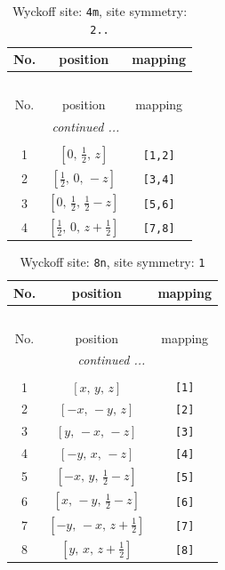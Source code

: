 \documentclass[fleqn,8pt]{jsarticle}
\begin{document}
\renewcommand{\arraystretch}{1.2}
\begin{longtable}{ccc}
\caption{Wyckoff site: {\tt 4m}, site symmetry: {\tt 2..}}
 \\
 \hline \hline
No. & position & mapping \\ \hline \endfirsthead

\multicolumn{2}{l}{\tablename\ \thetable{}} \\
 \hline \hline
No. & position & mapping \\ \hline \endhead

 \hline \hline
\multicolumn{2}{r}{\footnotesize\it continued ...} \\ \endfoot

 \hline \hline
\multicolumn{2}{r}{} \\ \endlastfoot

1 & $\left[ 0,\, \frac{1}{2},\, z \right]$ & {\tt [1,2]} \\ \hline
2 & $\left[ \frac{1}{2},\, 0,\, - z \right]$ & {\tt [3,4]} \\ \hline
3 & $\left[ 0,\, \frac{1}{2},\, \frac{1}{2} - z \right]$ & {\tt [5,6]} \\ \hline
4 & $\left[ \frac{1}{2},\, 0,\, z + \frac{1}{2} \right]$ & {\tt [7,8]} \\
\end{longtable}
\renewcommand{\arraystretch}{1.2}
\begin{longtable}{ccc}
\caption{Wyckoff site: {\tt 8n}, site symmetry: {\tt 1}}
 \\
 \hline \hline
No. & position & mapping \\ \hline \endfirsthead

\multicolumn{2}{l}{\tablename\ \thetable{}} \\
 \hline \hline
No. & position & mapping \\ \hline \endhead

 \hline \hline
\multicolumn{2}{r}{\footnotesize\it continued ...} \\ \endfoot

 \hline \hline
\multicolumn{2}{r}{} \\ \endlastfoot

1 & $\left[ x,\, y,\, z \right]$ & {\tt [1]} \\ \hline
2 & $\left[ - x,\, - y,\, z \right]$ & {\tt [2]} \\ \hline
3 & $\left[ y,\, - x,\, - z \right]$ & {\tt [3]} \\ \hline
4 & $\left[ - y,\, x,\, - z \right]$ & {\tt [4]} \\ \hline
5 & $\left[ - x,\, y,\, \frac{1}{2} - z \right]$ & {\tt [5]} \\ \hline
6 & $\left[ x,\, - y,\, \frac{1}{2} - z \right]$ & {\tt [6]} \\ \hline
7 & $\left[ - y,\, - x,\, z + \frac{1}{2} \right]$ & {\tt [7]} \\ \hline
8 & $\left[ y,\, x,\, z + \frac{1}{2} \right]$ & {\tt [8]} \\
\end{longtable}
\end{document}
